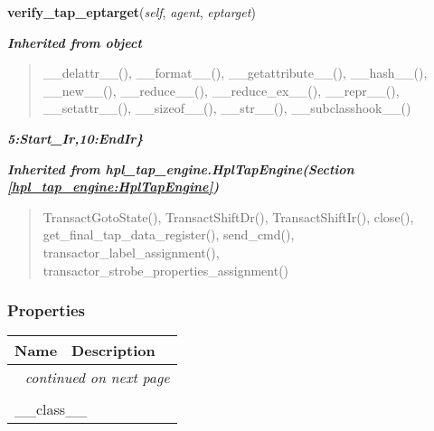 \hspace{.8\funcindent}\begin{boxedminipage}{\funcwidth}

    \raggedright \textbf{verify\_tap\_eptarget}(\textit{self}, \textit{agent}, \textit{eptarget})

\setlength{\parskip}{2ex}
\setlength{\parskip}{1ex}
    \end{boxedminipage}


\large{\textbf{\textit{Inherited from object}}}

\begin{quote}
\_\_delattr\_\_(), \_\_format\_\_(), \_\_getattribute\_\_(), \_\_hash\_\_(), \_\_new\_\_(), \_\_reduce\_\_(), \_\_reduce\_ex\_\_(), \_\_repr\_\_(), \_\_setattr\_\_(), \_\_sizeof\_\_(), \_\_str\_\_(), \_\_subclasshook\_\_()
\end{quote}

\large{\textbf{\textit{5:Start\_Ir,10:EndIr\}}}}


\large{\textbf{\textit{Inherited from hpl\_tap\_engine.HplTapEngine\textit{(Section \ref{hpl_tap_engine:HplTapEngine})}}}}

\begin{quote}
TransactGotoState(), TransactShiftDr(), TransactShiftIr(), close(), get\_final\_tap\_data\_register(), send\_cmd(), transactor\_label\_assignment(), transactor\_strobe\_properties\_assignment()
\end{quote}


  \subsubsection{Properties}

    \vspace{-1cm}
\hspace{\varindent}\begin{longtable}{|p{\varnamewidth}|p{\vardescrwidth}|l}
\cline{1-2}
\cline{1-2} \centering \textbf{Name} & \centering \textbf{Description}& \\
\cline{1-2}
\endhead\cline{1-2}\multicolumn{3}{r}{\small\textit{continued on next page}}\\\endfoot\cline{1-2}
\endlastfoot\multicolumn{2}{|l|}{\textit{Inherited from object}}\\
\multicolumn{2}{|p{\varwidth}|}{\raggedright \_\_class\_\_}\\
\cline{1-2}
\end{longtable}

